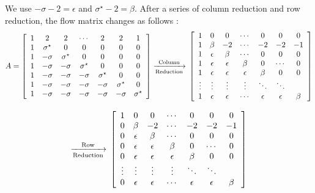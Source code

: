 We use  $-\sigma - 2 = \epsilon$ and $\sigma^{\star} -2 = \beta$.  After a series of column reduction and row reduction, the flow matrix changes as follows :
\begin{equation*}
     {A = \left[ \begin{array}{ccccccc}
1 & 2 & 2 & \cdots & 2 & 2 & 1\\
1 & {\sigma}^{\star} & 0 & 0 & 0 & 0 &0\\
1 & -\sigma & {\sigma}^{\star} & 0 & 0 & 0 & 0 \\
1 & -\sigma & -\sigma & {\sigma}^{\star} & 0 & 0 & 0 \\
1 & -\sigma & -\sigma & -\sigma & {\sigma}^{\star} & 0 & 0\\
1 & -\sigma & -\sigma & -\sigma & -\sigma & {\sigma}^{\star} & 0\\
1 & -\sigma & -\sigma & -\sigma & -\sigma & -\sigma & {\sigma}^{\star}\\
\end{array} 
\right ]
\xrightarrow[\text{Reduction}]{\text{Column}}\\
\left[ \begin{array}{ccccccc}
1 & 0 & 0 & \cdots & 0 & 0 & 0\\
1 & \beta & -2 & \cdots& -2 & -2 & -1\\
1 & \epsilon & \beta & \cdots & 0 & 0 & 0 \\
1 & \epsilon & \epsilon & \beta & 0 & \cdots & 0 \\
1 & \epsilon & \epsilon & \epsilon & \beta & 0 & 0 \\
\vdots & \vdots & \vdots  &   \vdots & \ddots & \ddots\\
1 & \epsilon & \epsilon & \cdots & \epsilon & \epsilon & \beta
\end{array} 
\right ]
}
\end{equation*}

\begin{equation*}
{\xrightarrow[\text{Reduction}]{\text{Row}}\\
\left[ \begin{array}{ccccccc}
1 & 0 & 0 & \cdots & 0 & 0 & 0\\
0 & \beta & -2 & \cdots& -2 & -2 & -1\\
0 & \epsilon & \beta & \cdots & 0 & 0 & 0 \\
0 & \epsilon & \epsilon & \beta & 0 & \cdots & 0 \\
0 & \epsilon & \epsilon & \epsilon & \beta & 0 & 0 \\
\vdots & \vdots & \vdots  &   \vdots & \ddots & \ddots\\
0 & \epsilon & \epsilon & \cdots & \epsilon & \epsilon & \beta
\end{array} 
\right ]
}
\end{equation*}

